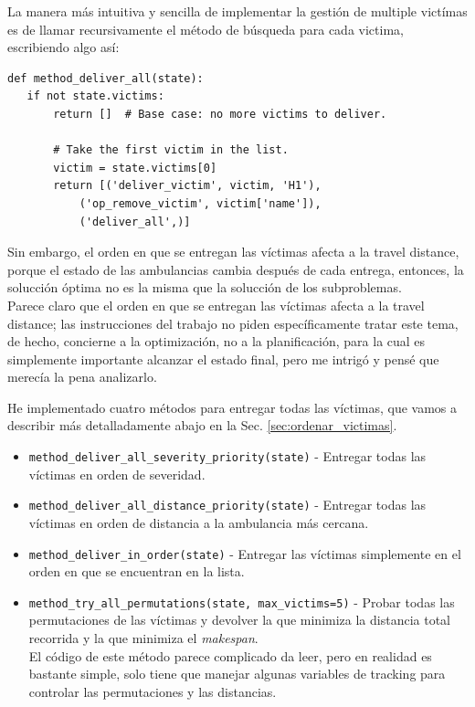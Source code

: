 La manera más intuitiva y sencilla de implementar la gestión de multiple victímas es de llamar recursivamente el método de búsqueda para cada victima, escribiendo algo así:
\begin{lstlisting}[caption={Esto no se encuentra en el codigo entregado}, captionpos=b]
   def method_deliver_all(state):
   if not state.victims:
       return []  # Base case: no more victims to deliver.
   
       # Take the first victim in the list.
       victim = state.victims[0]
       return [('deliver_victim', victim, 'H1'),
           ('op_remove_victim', victim['name']),
           ('deliver_all',)]
\end{lstlisting}

Sin embargo, el orden en que se entregan las víctimas afecta a la travel distance, porque el estado de las ambulancias cambia después de cada entrega, entonces, la solucción óptima no es la misma que la solucción de los subproblemas.\\
Parece claro que el orden en que se entregan las víctimas afecta a la travel distance;
las instrucciones del trabajo no piden específicamente tratar este tema, de hecho, concierne a la optimización, no a la planificación, para la cual es simplemente importante alcanzar el estado final, pero me intrigó y pensé que merecía la pena analizarlo.

He implementado cuatro métodos para entregar todas las víctimas, que vamos a describir más detalladamente abajo en la Sec. \ref{sec:ordenar_victimas}.
\begin{itemize}
   \item \lstinline|method_deliver_all_severity_priority(state)| - Entregar todas las víctimas en orden de severidad.
   \item \lstinline|method_deliver_all_distance_priority(state)| - Entregar todas las víctimas en orden de distancia a la ambulancia más cercana.
   \item \lstinline|method_deliver_in_order(state)| - Entregar las víctimas simplemente en el orden en que se encuentran en la lista.
   \item \lstinline|method_try_all_permutations(state, max_victims=5)| - Probar todas las permutaciones de las víctimas y devolver la que minimiza la distancia total recorrida y la que minimiza el \textit{makespan}.\\
   El código de este método parece complicado da leer, pero en realidad es bastante simple, solo tiene que manejar algunas variables de tracking para controlar las permutaciones y las distancias.
\end{itemize}

